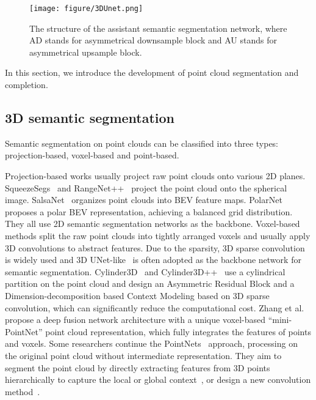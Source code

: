\documentclass[letterpaper, 10 pt, conference]{ieeeconf}
\begin{document}
\begin{figure}[h]
	\centering
	\texttt{[image: figure/3DUnet.png]}
	\caption{The structure of the assistant semantic segmentation network, where AD stands for asymmetrical downsample block and AU stands for asymmetrical upsample block.}
	\label{fig:3DUnet}
\end{figure}

In this section, we introduce the development of point cloud segmentation and completion.

\subsection{3D semantic segmentation}

Semantic segmentation on point clouds can be classified into three types: projection-based, voxel-based and point-based. 

Projection-based works usually project raw point clouds onto various 2D planes. SqueezeSegs~\cite{wu2017squeezeseg, wu2018squeezesegv2, xu2020squeezesegv3} and RangeNet++~\cite{milioto2019iros} project the point cloud onto the spherical image. SalsaNet~\cite{aksoy2019salsanet} organizes point clouds into BEV feature maps. PolarNet~\cite{Zhang_2020_CVPR} proposes a polar BEV representation, achieving a balanced grid distribution. They all use 2D semantic segmentation networks as the backbone. 
Voxel-based methods split the raw point clouds into tightly arranged voxels and usually apply 3D convolutions to abstract features. Due to the sparsity, 3D sparse convolution~\cite{graham20183d} is widely used and 3D UNet-like~\cite{cciccek20163d} is often adopted as the backbone network for semantic segmentation. Cylinder3D~\cite{zhou2020cylinder3d} and Cylinder3D++~\cite{zhu2020cylindrical} use a cylindrical partition on the point cloud and design an Asymmetric Residual Block and a Dimension-decomposition based Context Modeling based on 3D sparse convolution, which can significantly reduce the computational cost. Zhang et al.~\cite{zhang2020deep} propose a deep fusion network architecture with a unique voxel-based “mini-PointNet” point cloud representation, which fully integrates the features of points and voxels.
Some researchers continue the PointNets~\cite{qi2017pointnet,qi2017pointnet++} approach, processing on the original point cloud without intermediate representation. They aim to segment the point cloud by directly extracting features from 3D points hierarchically to capture the local or global context~\cite{hu2020randla}, or design a new convolution method~\cite{xu2018spidercnn, thomas2019kpconv}.
\end{document}

